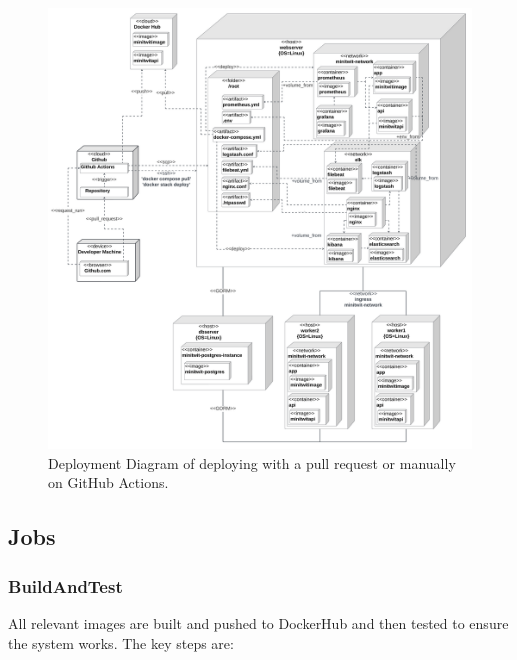 \documentclass[12pt, a4paper, oneside]{book}
\begin{document}
\begin{figure}
    \centering
    \includegraphics[width=\linewidth]{images/uml-deployment-githubactions.png}
    \caption{Deployment Diagram of deploying with a pull request or manually on GitHub Actions.}
    \label{fig:deployment-cicd-minimal}
\end{figure}

\newpage

\subsection{Jobs}
\subsubsection{BuildAndTest}
All relevant images are built and pushed to DockerHub and then tested to ensure the system works. The key steps are:
\end{document}
